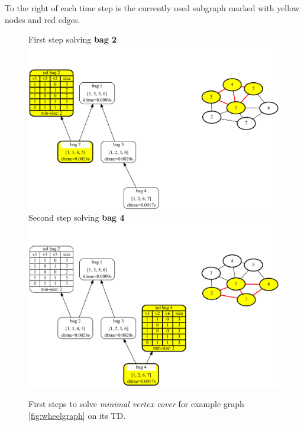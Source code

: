 \documentclass[a4paper, 12pt, bibliography=totoc]{scrartcl}
\begin{document}
To the right of each time step is the currently used subgraph marked with yellow nodes and red edges.


\begin{figure}[H]
	\centering
		First step solving \textbf{bag 2}
	\includegraphics[width=0.9\linewidth]{images/WheelGraph7/combined2.pdf} \vspace{1em}\\
	Second step solving \textbf{bag 4}\\
	
		\includegraphics[width=0.9\linewidth]{images/WheelGraph7/combined3.pdf}
	\caption{First steps to solve \textit{minimal vertex cover} for example graph \ref{fig:wheelgraph} on its TD.}
	\label{fig:wheelgraphc23}
\end{figure}
\end{document}

